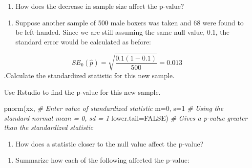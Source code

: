 \documentclass[
]{report}
\newenvironment{Shaded}{\begin{snugshade}}{\end{snugshade}}
\newcommand{\AttributeTok}[1]{\textcolor[rgb]{0.77,0.63,0.00}{#1}}
\newcommand{\CommentTok}[1]{\textcolor[rgb]{0.56,0.35,0.01}{\textit{#1}}}
\newcommand{\ConstantTok}[1]{\textcolor[rgb]{0.00,0.00,0.00}{#1}}
\newcommand{\DecValTok}[1]{\textcolor[rgb]{0.00,0.00,0.81}{#1}}
\newcommand{\FunctionTok}[1]{\textcolor[rgb]{0.00,0.00,0.00}{#1}}
\newcommand{\NormalTok}[1]{#1}
\providecommand{\tightlist}{%
  \setlength{\itemsep}{0pt}\setlength{\parskip}{0pt}}
\begin{document}
\begin{enumerate}
\def\labelenumi{\arabic{enumi}.}
\setcounter{enumi}{16}
\tightlist
\item
  How does the decrease in sample size affect the p-value?
\end{enumerate}

\vspace{0.3in}

\begin{enumerate}
\def\labelenumi{\arabic{enumi}.}
\setcounter{enumi}{17}
\tightlist
\item
  Suppose another sample of 500 male boxers was taken and 68 were found to be left-handed. Since we are still assuming the same null value, 0.1, the standard error would be calculated as before:
\end{enumerate}

\[SE_0(\hat{p})=\sqrt{\frac{0.1(1-0.1)}{500}} = 0.013\].Calculate the standardized statistic for this new sample.

\vspace{0.8in}

Use Rstudio to find the p-value for this new sample.

\begin{Shaded}
\begin{Highlighting}[]
\FunctionTok{pnorm}\NormalTok{(xx, }\CommentTok{\# Enter value of standardized statistic}
      \AttributeTok{m=}\DecValTok{0}\NormalTok{, }\AttributeTok{s=}\DecValTok{1} \CommentTok{\# Using the standard normal mean = 0, sd = 1}
      \AttributeTok{lower.tail=}\ConstantTok{FALSE}\NormalTok{) }\CommentTok{\# Gives a p{-}value greater than the standardized statistic}
\end{Highlighting}
\end{Shaded}

\begin{enumerate}
\def\labelenumi{\arabic{enumi}.}
\setcounter{enumi}{18}
\tightlist
\item
  How does a statistic closer to the null value affect the p-value?
\end{enumerate}

\vspace{0.3in}

\begin{enumerate}
\def\labelenumi{\arabic{enumi}.}
\setcounter{enumi}{19}
\tightlist
\item
  Summarize how each of the following affected the p-value:
\end{enumerate}
\end{document}
